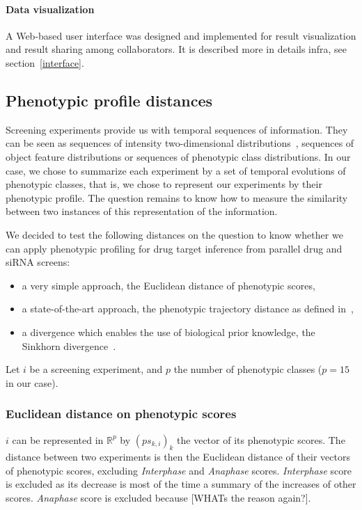 \paragraph{Data visualization}
A Web-based user interface was designed and implemented for result visualization and result sharing among collaborators. It is described more in details infra, see section~\ref{interface}.

\subsection{Phenotypic profile distances}
\label{sec:distances}
Screening experiments provide us with temporal sequences of information. They can be seen as sequences of intensity two-dimensional distributions~\cite{pmid22743764}, sequences of object feature distributions or sequences of phenotypic class distributions. In our case, we chose to summarize each experiment by a set of temporal evolutions of phenotypic classes, that is, we chose to represent our experiments by their phenotypic profile. The question remains to know how to measure the similarity between two instances of this representation of the information.

We decided to test the following distances on the question to know whether we can apply phenotypic profiling for drug target inference from parallel drug and siRNA screens:
\begin{itemize}
\item a very simple approach, the Euclidean distance of phenotypic scores, 
\item a state-of-the-art approach, the phenotypic trajectory distance as defined in~\cite{Walter2010},
\item a divergence which enables the use of biological prior knowledge, the Sinkhorn divergence~\cite{sinkhorn}.
\end{itemize}

Let $i$ be a screening experiment, and $p$ the number of phenotypic classes ($p=15$ in our case). 
\subsubsection{Euclidean distance on phenotypic scores}
$i$ can be represented in $\mathbb{R}^p$ by $(ps_{k,i})_k$ the vector of its phenotypic scores. The distance between two experiments is then the Euclidean distance of their vectors of phenotypic scores, excluding \textit{Interphase} and \textit{Anaphase} scores. \textit{Interphase} score is excluded as its decrease is most of the time a summary of the increases of other scores. \textit{Anaphase} score is excluded because [WHATs the reason again?]. 

